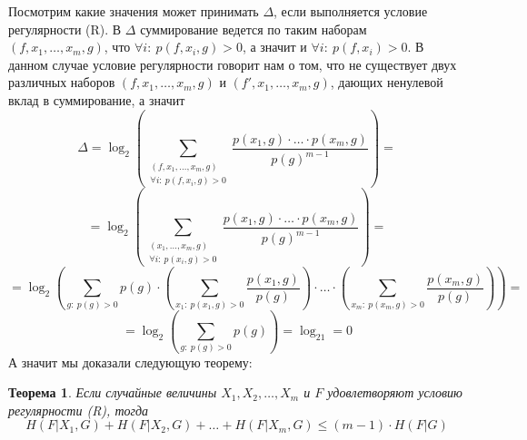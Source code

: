 \documentclass[a4paper]{article}
\newtheorem{mtheorem}{Теорема}[section]
\begin{document}
Посмотрим какие значения может принимать $\Delta$, если выполняется условие регулярности (R). В $\Delta$ 
суммирование ведется по таким наборам $(f, x_1, \ldots, x_m, g)$, что $\forall i:\ p(f,x_i,g)>0$, а 
значит и $\forall i:\ p(f,x_i)>0$. В данном случае условие регулярности говорит нам о том, что
не существует двух различных наборов $(f, x_1, \ldots, x_m, g)$ и $(f', x_1, \ldots, x_m, g)$, дающих 
ненулевой вклад в суммирование, а значит $$\Delta = \log_2\left(\sum\limits_{\substack{(f,x_1,\ldots,x_m,g) 
\\ \forall i:\ p(f,x_i,g)>0}}\frac{p(x_1,g)\cdot\ldots\cdot p(x_m,g)}{p(g)^{m-1}}\right) = $$ 
$$ = \log_2\left(\sum\limits_{\substack{(x_1,\ldots,x_m,g) \\ \forall i:\ p(x_i,g)>0}}\frac{p(x_1,g)\cdot\ldots\cdot p(x_m,g)}{p(g)^{m-1}}\right) = $$
$$ = \log_2\left(\sum\limits_{g:\ p(g) > 0}p(g)\cdot\left(\sum\limits_{x_1:\ p(x_1, g) > 0}\frac{p(x_1,g)}{p(g)}\right)\cdot\ldots
\cdot\left(\sum\limits_{x_m:\ p(x_m, g) > 0}\frac{p(x_m,g)}{p(g)}\right)\right) = $$ 
$$ = \log_2\left(\sum\limits_{g:\ p(g) > 0}p(g)\right) = \log_21 = 0$$ А значит мы доказали следующую теорему:
\begin{mtheorem}
    Если случайные величины $X_1, X_2, \ldots, X_m$ и $F$ удовлетворяют условию регулярности (R), тогда 
    $$H(F|X_1, G) + H(F|X_2, G) + \ldots + H(F|X_m, G) \leq (m-1)\cdot H(F|G)$$
\end{mtheorem}









\end{document}
